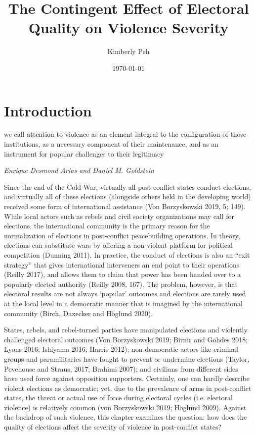 \documentclass [11pt]{article}
\title{The Contingent Effect of Electoral Quality on Violence Severity}
\author{Kimberly Peh}
\date{\today}
\begin{document}
\maketitle

\section*{Introduction} %

\epigraph{we call attention to violence as an element integral to the configuration of those institutions, as a necessary component of their maintenance, and as an instrument for popular challenges to their legitimacy}{\emph{Enrique Desmond Arias and Daniel M. Goldstein}} %

Since the end of the Cold War, virtually all post-conflict states conduct elections, and virtually all of these elections (alongside others held in the developing world) received some form of international assistance (Von Borzyskowski 2019, 5; 149). While local actors such as rebels and civil society organizations may call for elections, the international community is the primary reason for the normalization of elections in post-conflict peacebuilding operations. In theory, elections can substitute wars by offering a non-violent platform for political competition (Dunning 2011). In practice, the conduct of elections is also an ``exit strategy'' that gives international interveners an end point to their operations (Reilly 2017), and allows them to claim that power has been handed over to a popularly elected authority (Reilly 2008, 167). The problem, however, is that electoral results are not always `popular' outcomes and elections are rarely used at the local level in a democratic manner that is imagined by the international community (Birch, Daxecker and Höglund 2020).

States, rebels, and rebel-turned parties have manipulated elections and violently challenged electoral outcomes (Von Borzyskowski 2019; Birnir and Gohdes 2018; Lyons 2016; Ishiyama 2016; Harris 2012); non-democratic actors like criminal groups and paramilitaries have fought to prevent or undermine elections (Taylor, Pevehouse and Straus, 2017; Brahimi 2007); and civilians from different sides have used force against opposition supporters. Certainly, one can hardly describe violent elections as democratic; yet, due to the prevalence of arms in post-conflict states, the threat or actual use of force during electoral cycles (i.e. electoral violence) is relatively common (von Borzyskowski 2019; Höglund 2009). Against the backdrop of such violence, this chapter examines the question: how does the quality of elections affect the severity of violence in post-conflict states? %
\end{document}
